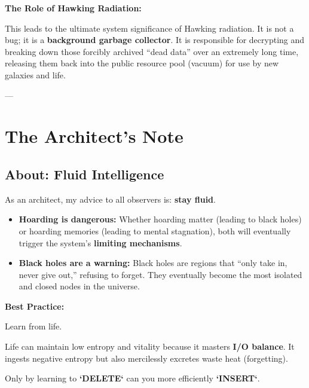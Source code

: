\textbf{The Role of Hawking Radiation:}

This leads to the ultimate system significance of Hawking radiation. It is not a bug; it is a \textbf{background garbage collector}. It is responsible for decrypting and breaking down those forcibly archived ``dead data'' over an extremely long time, releasing them back into the public resource pool (vacuum) for use by new galaxies and life.

---

\section{The Architect's Note}

\subsection{About: Fluid Intelligence}

As an architect, my advice to all observers is: \textbf{stay fluid}.

\begin{itemize}
\item \textbf{Hoarding is dangerous:} Whether hoarding matter (leading to black holes) or hoarding memories (leading to mental stagnation), both will eventually trigger the system's \textbf{limiting mechanisms}.

\item \textbf{Black holes are a warning:} Black holes are regions that ``only take in, never give out,'' refusing to forget. They eventually become the most isolated and closed nodes in the universe.
\end{itemize}

\textbf{Best Practice:}

Learn from life.

Life can maintain low entropy and vitality because it masters \textbf{I/O balance}. It ingests negative entropy but also mercilessly excretes waste heat (forgetting).

Only by learning to \textbf{`DELETE`} can you more efficiently \textbf{`INSERT`}.

